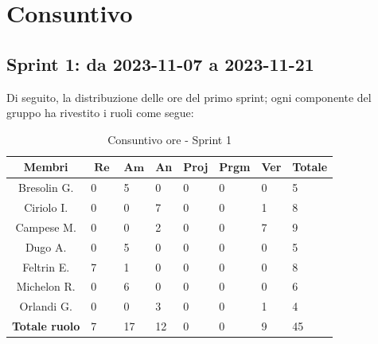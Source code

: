 \documentclass[10pt, a4paper]{article}
\begin{document}
\newpage


\section{Consuntivo}

\subsection{Sprint 1: da 2023-11-07 a 2023-11-21}
Di seguito, la distribuzione delle ore del primo sprint; ogni componente del gruppo ha rivestito i ruoli come segue:
\begin{table}[H]
\begin{tabularx}{\textwidth}{c|X|X|X|X|X|X|X}
        \textbf{Membri} & $\operatorname{\textbf{Re}}$ & $\mathrm{\textbf{Am}}$ & \textbf{An} & \textbf{Proj} & \textbf{Prgm} & \textbf{Ver} & \textbf{Totale} \\
        \hline Bresolin G. & 0 & 5 & 0 & 0 & 0 & 0 & 5 \\
        \hline Ciriolo I.  & 0 & 0 & 7 & 0 & 0 & 1 & 8 \\
        \hline Campese M.  & 0 & 0 & 2 & 0 & 0 & 7 & 9 \\
        \hline Dugo A.     & 0 & 5 & 0 & 0 & 0 & 0 & 5 \\
        \hline Feltrin E.  & 7 & 1 & 0 & 0 & 0 & 0 & 8 \\
        \hline Michelon R. & 0 & 6 & 0 & 0 & 0 & 0 & 6 \\
        \hline Orlandi G.  & 0 & 0 & 3 & 0 & 0 & 1 & 4 \\
        \hline
        \textbf{Totale ruolo} & 7 & 17 & 12 & 0 & 0 & 9 & 45 
    \end{tabularx}
    \caption{Consuntivo ore - Sprint 1}
    \end{table}
\end{document}
